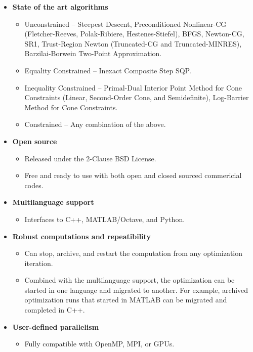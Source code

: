 \documentclass{report}
\begin{document}
\begin{itemize}
    \item {\bf State of the art algorithms}
        \begin{itemize}
            \item Unconstrained -- Steepest Descent, Preconditioned Nonlinear-CG (Fletcher-Reeves, Polak-Ribiere, Hestenes-Stiefel), BFGS, Newton-CG, SR1, Trust-Region Newton (Truncated-CG and Truncated-MINRES), Barzilai-Borwein Two-Point Approximation.
            \item Equality Constrained -- Inexact Composite Step SQP.
            \item Inequality Constrained -- Primal-Dual Interior Point Method for Cone Constraints (Linear, Second-Order Cone, and Semidefinite), Log-Barrier Method for Cone Constraints.
            \item Constrained -- Any combination of the above.
        \end{itemize}
    \item {\bf Open source}
        \begin{itemize}
            \item Released under the 2-Clause BSD License.
            \item Free and ready to use with both open and closed sourced commericial codes.
        \end{itemize}
    \item {\bf Multilanguage support}
        \begin{itemize}
            \item Interfaces to C++, MATLAB/Octave, and Python.
        \end{itemize}
    \item {\bf Robust computations and repeatibility}
        \begin{itemize}
            \item Can stop, archive, and restart the computation from any optimization iteration.
            \item Combined with the multilanguage support, the optimization can be started in one language and migrated to another.  For example, archived optimization runs that started in MATLAB can be migrated and completed in C++.
        \end{itemize}
    \item {\bf User-defined parallelism}
        \begin{itemize}
            \item Fully compatible with OpenMP, MPI, or GPUs.

\end{itemize}
\end{itemize}
\end{document}
